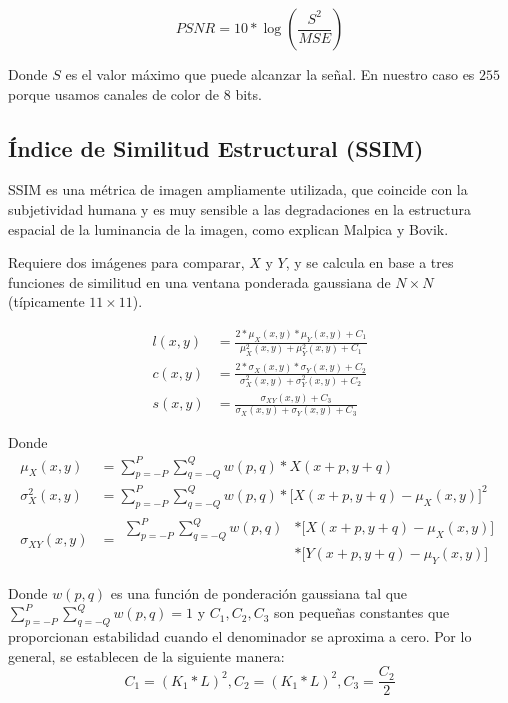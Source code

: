 \documentclass{cslthse-msc}
\begin{document}
\begin{equation}\label{eq:psnr}
PSNR=10*\log\left(\frac{S^2}{MSE}\right)
\end{equation}

Donde $S$ es el valor máximo que puede alcanzar la señal. En nuestro caso es $255$ porque usamos canales de color de 8 bits.

\subsection{Índice de Similitud Estructural (SSIM)}
SSIM es una métrica de imagen ampliamente utilizada, que coincide con la subjetividad humana y es muy sensible a las degradaciones en la estructura espacial de la luminancia de la imagen, como explican Malpica y Bovik. \cite{Malpica2009}

Requiere dos imágenes para comparar, $X$ y $Y$, y se calcula en base a tres funciones de similitud en una ventana ponderada gaussiana de $N\times N$ (típicamente $11\times 11$).

\begin{equation}\label{eq:ssim_components}
\begin{split}
l(x,y) & = \frac{2*\mu_X(x,y)*\mu_Y(x,y)+C_1}{\mu_X^2(x,y)+\mu_Y^2(x,y)+C_1} \\ 
c(x,y) & = \frac{2*\sigma_X(x,y)*\sigma_Y(x,y)+C_2}{\sigma_X^2(x,y)+\sigma_Y^2(x,y)+C_2} \\ 
s(x,y) & = \frac{\sigma_{XY}(x,y)+C_3}{\sigma_X(x,y)+\sigma_Y(x,y)+C_3}
\end{split}
\end{equation}

Donde
\begin{equation*}
\begin{split}
\mu_X(x,y) & = \sum\limits_{p=-P}^{P} \sum\limits_{q=-Q}^{Q} w(p,q)*X(x+p,y+q)\\ 
\sigma_X^2(x,y) & = \sum\limits_{p=-P}^{P} \sum\limits_{q=-Q}^{Q} w(p,q)*\lbrack X(x+p,y+q)-\mu_X(x,y) \rbrack^2\\ 
\sigma_{XY}(x,y) & = \begin{split}\sum\limits_{p=-P}^{P} \sum\limits_{q=-Q}^{Q} w(p,q)& *\lbrack X(x+p,y+q)-\mu_X(x,y)\rbrack \\ & *\lbrack Y(x+p,y+q)-\mu_Y(x,y)\rbrack\end{split}
\end{split}
\end{equation*}

Donde $w(p, q)$ es una función de ponderación gaussiana tal que $\sum\limits_{p = -P}^{P}\sum\limits_{q = -Q}^{Q} w(p, q) = 1$ y $C_1, C_2, C_3$ son pequeñas constantes que proporcionan estabilidad cuando el denominador se aproxima a cero. Por lo general, se establecen de la siguiente manera: 
\begin{equation*}
	C_1=(K_1*L)^2,C_2=(K_1*L)^2,C_3=\frac{C_2}{2}
\end{equation*}
\end{document}
